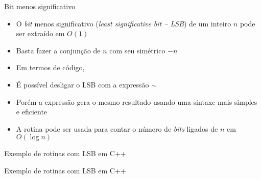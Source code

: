 \begin{frame}[fragile]{Bit menos significativo}

    \begin{itemize}
        \item O \textit{bit} menos significativo (\textit{least significative bit -- LSB}) de um 
            inteiro $n$ pode ser extraído em $O(1)$

        \item Basta fazer a conjunção de $n$ com seu simétrico $-n$

        \item Em termos de código, 

        \item É possível desligar o LSB com a expressão  $\sim$

        \item Porém a expressão  gera o mesmo resultado usando uma
            sintaxe mais simples e eficiente

        \item A rotina  pode ser usada para contar o número de \textit{bits} 
            ligados de $n$ em $O(\log n)$

    \end{itemize}

\end{frame}

\begin{frame}[fragile]{Exemplo de rotinas com LSB em C++}
\end{frame}

\begin{frame}[fragile]{Exemplo de rotinas com LSB em C++}
\end{frame}
